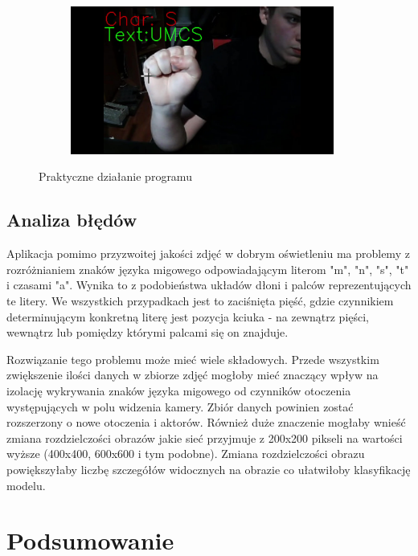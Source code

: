 \documentclass[a4paper,12pt,oneside]{book} %
\begin{document}
\begin{figure}[h]
\begin{subfigure}{0.4\textwidth}
	\end{subfigure}
	\begin{subfigure}{0.4\textwidth}
		\centering
		\includegraphics[width=0.95\textwidth]{UMCS.jpg}
	\end{subfigure}
	\caption{Praktyczne działanie programu}
	\label{umcs}
\end{figure}

\section{Analiza błędów}

Aplikacja pomimo przyzwoitej jakości zdjęć w dobrym oświetleniu ma problemy z rozróżnianiem znaków języka migowego odpowiadającym literom "m", "n", "s", "t" i czasami "a". Wynika to z podobieństwa układów dłoni i palców reprezentujących te litery. We wszystkich przypadkach jest to zaciśnięta pięść, gdzie czynnikiem determinującym konkretną literę jest pozycja kciuka - na zewnątrz pięści, wewnątrz lub pomiędzy którymi palcami się on znajduje.

Rozwiązanie tego problemu może mieć wiele składowych. Przede wszystkim zwiększenie ilości danych w zbiorze zdjęć mogłoby mieć znaczący wpływ na izolację wykrywania znaków języka migowego od czynników otoczenia występujących w polu widzenia kamery. Zbiór danych powinien zostać rozszerzony o nowe otoczenia i aktorów. Również duże znaczenie mogłaby wnieść zmiana rozdzielczości obrazów jakie sieć przyjmuje z 200x200 pikseli na wartości wyższe (400x400, 600x600 i tym podobne). Zmiana rozdzielczości obrazu powiększyłaby liczbę szczegółów widocznych na obrazie co ułatwiłoby klasyfikację modelu.

\chapter{Podsumowanie}
\end{document}
